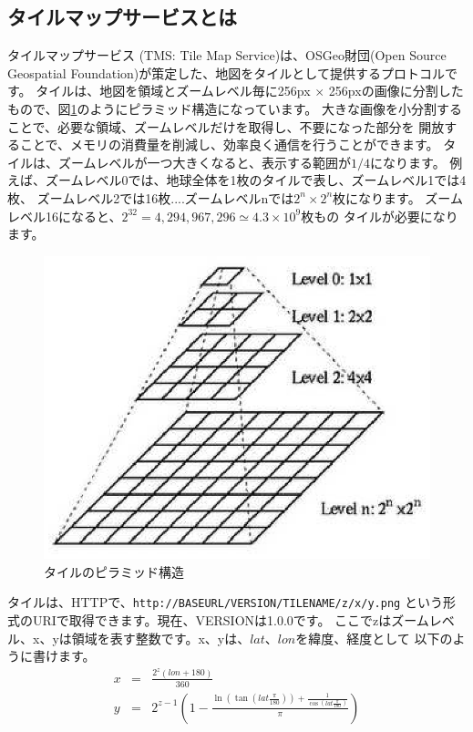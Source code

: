 \documentclass[mingoth,a4paper]{jsarticle}
\begin{document}
\subsection{タイルマップサービスとは}
タイルマップサービス (TMS: Tile Map Service)は、OSGeo財団(Open Source Geospatial Foundation)が策定した、地図をタイルとして提供するプロトコルです。
タイルは、地図を領域とズームレベル毎に256px $\times$ 256pxの画像に分割した
もので、図\ref{fig:tile_pylamid}のようにピラミッド構造になっています。
大きな画像を小分割することで、必要な領域、ズームレベルだけを取得し、不要になった部分を
開放することで、メモリの消費量を削減し、効率良く通信を行うことができます。
タイルは、ズームレベルが一つ大きくなると、表示する範囲が$1/4$になります。
例えば、ズームレベル0では、地球全体を1枚のタイルで表し、ズームレベル1では4枚、
ズームレベル2では16枚....ズームレベルnでは$2^n \times 2^n$枚になります。
ズームレベル16になると、$2^{32} = 4,294,967,296 \simeq 4.3 \times 10^9$枚もの
タイルが必要になります。
%
\begin{figure}[hbp]
\centering
\includegraphics{image201408/Tiling.eps}
\caption{タイルのピラミッド構造\cite{ref:tile}}
\label{fig:tile_pylamid}
\end{figure}

タイルは、HTTPで、\texttt{http://BASEURL/VERSION/TILENAME/z/x/y.png} という形式のURIで取得できます。現在、VERSIONは1.0.0です。
ここでzはズームレベル、x、yは領域を表す整数です。x、yは、$lat$、$lon$を緯度、経度として
以下のように書けます\cite{ref:tilename}。
\begin{eqnarray*}
x &=& \frac{2^z(lon + 180)}{360}\\
y &=& 2^{z-1}(1-\frac{\ln(\tan(lat\frac{\pi}{180})) + \frac{1}{\cos(lat\frac{\pi}{180})}
}{\pi})
\end{eqnarray*}
\end{document}
